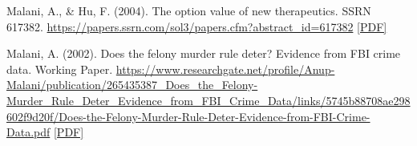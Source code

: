 \begin{tablist}
        \item[2004] \tab{}Malani, A., \& Hu, F. (2004). The option value of new therapeutics. SSRN 617382. \href{https://papers.ssrn.com/sol3/papers.cfm?abstract_id=617382}{https://papers.ssrn.com/sol3/papers.cfm?abstract\_id=617382} \href{https://github.com/anup-malani/website_personal/blob/main/publications/2004_MalaniHu_OptionValueNewTherapeutics.pdf}{[PDF]} 

        \item[2002] \tab{}Malani, A. (2002). Does the felony murder rule deter? Evidence from FBI crime data. Working Paper. \href{https://www.researchgate.net/profile/Anup-Malani/publication/265435387_Does_the_Felony-Murder_Rule_Deter_Evidence_from_FBI_Crime_Data/links/5745b88708ae298602f9d20f/Does-the-Felony-Murder-Rule-Deter-Evidence-from-FBI-Crime-Data.pdf}{https://www.researchgate.net/profile/Anup-Malani/publication/265435387\_Does\_the\_Felony-Murder\_Rule\_Deter\_Evidence\_from\_FBI\_Crime\_Data/links/5745b88708ae298602f9d20f/Does-the-Felony-Murder-Rule-Deter-Evidence-from-FBI-Crime-Data.pdf} \href{https://github.com/anup-malani/website_personal/blob/main/publications/2002_Malani_FelonyMurderRule.pdf}{[PDF]}

    \end{tablist}
